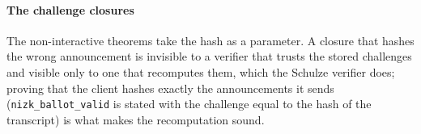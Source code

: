 \paragraph{The challenge closures}
The non-interactive theorems take the hash as a parameter. A closure that
hashes the wrong announcement is invisible to a verifier that trusts the
stored challenges and visible only to one that recomputes them, which the
Schulze verifier does; proving that the client hashes exactly the
announcements it sends (\texttt{nizk\_ballot\_valid} is stated with the
challenge equal to the hash of the transcript) is what makes the
recomputation sound.
